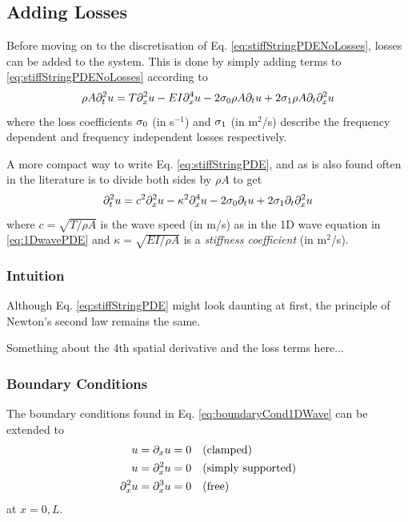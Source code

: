 \subsection{Adding Losses}
Before moving on to the discretisation of Eq. \eqref{eq:stiffStringPDENoLosses}, losses can be added to the system. This is done by simply adding terms to \eqref{eq:stiffStringPDENoLosses} according to 
\begin{equation}\label{eq:stiffStringPDE}
    \rho A \partial_t^2 u = T \partial_x^2 u - EI \partial_x^4 u - 2 \sigma_{0} \rho A \partial_t u + 2 \sigma_{1} \rho A\partial_t \partial_x^2 u
\end{equation}
where the loss coefficients $\sigma_{0}$ (in s$^{-1}$) and $\sigma_{1}$ (in m$^2$/s) describe the frequency dependent and frequency independent losses respectively. 

A more compact way to write Eq. \eqref{eq:stiffStringPDE}, and as is also found often in the literature \cite{theBible}  is to divide both sides by $\rho A$ to get
\begin{equation}\label{eq:stiffStringPDECompact}
    \partial_t^2 u = c^2 \partial_x^2 u - \kappa^2 \partial_x^4 u - 2 \sigma_{0} \partial_t u + 2 \sigma_{1} \partial_t \partial_x^2 u
\end{equation}
where $c=\sqrt{T/\rho A}$ is the wave speed  (in m/s) as in the 1D wave equation in \eqref{eq:1DwavePDE} and $\kappa = \sqrt{EI / \rho A}$ is a \textit{stiffness coefficient} (in m$^2$/s).

\subsubsection{Intuition}
Although Eq. \eqref{eq:stiffStringPDE} might look daunting at first, the principle of Newton's second law remains the same. 

Something about the 4th spatial derivative and the loss terms here...

\subsubsection{Boundary Conditions}
The boundary conditions found in Eq. \eqref{eq:boundaryCond1DWave} can be extended to
\begin{subequations}\label{eq:stiffStringBoundConds}
    \begin{align}
        u = \partial_x u &= 0 \quad \text{(clamped)}\label{eq:BCclamped}\\
        u = \partial_x^2 u &= 0 \quad \text{(simply supported)}\label{eq:BCsimplySupported}\\
        \partial_x^2 u = \partial_x^3 u &= 0 \quad \text{(free)}\label{eq:BCfree}
    \end{align}
\end{subequations}
at $x = 0, L$.

